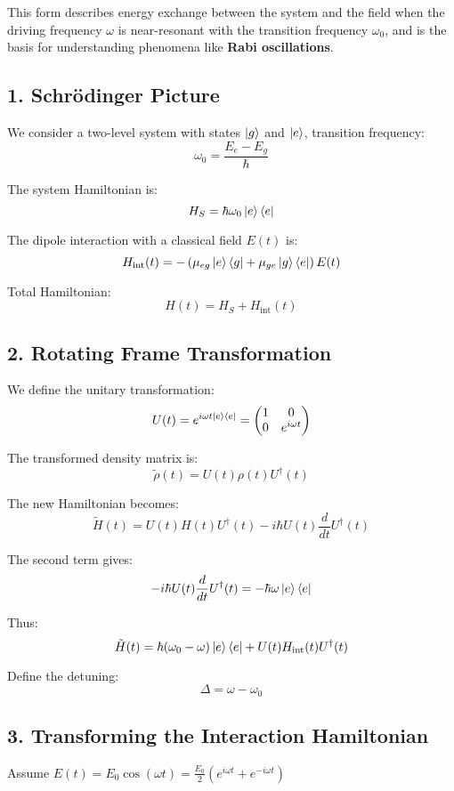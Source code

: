 This form describes energy exchange between the system and the field when the driving frequency \(\omega\) is near-resonant with the transition frequency \(\omega_0\), and is the basis for understanding phenomena like \textbf{Rabi oscillations}.

\subsection{1. Schrödinger Picture}
We consider a two-level system with states $\ket{g}$ and $\ket{e}$, transition frequency:
\[
	\omega_0 = \frac{E_e - E_g}{\hbar}
\]

The system Hamiltonian is:
\[
	H_S = \hbar \omega_0 \ket{e}\bra{e}
\]

The dipole interaction with a classical field $E(t)$ is:
\[
	H_{\text{int}}(t) = -\left( \mu_{eg} \ket{e}\bra{g} + \mu_{ge} \ket{g}\bra{e} \right) E(t)
\]

Total Hamiltonian:
\[
	H(t) = H_S + H_{\text{int}}(t)
\]

\subsection*{2. Rotating Frame Transformation}

We define the unitary transformation:
\[
	U(t) = e^{i \omega t \ket{e}\bra{e}} =
	\begin{pmatrix}
		1 & 0             \\
		0 & e^{i\omega t}
	\end{pmatrix}
\]

The transformed density matrix is:
\[
	\tilde{\rho}(t) = U(t) \rho(t) U^\dagger(t)
\]

The new Hamiltonian becomes:
\[
	\tilde{H}(t) = U(t) H(t) U^\dagger(t) - i\hbar U(t) \frac{d}{dt} U^\dagger(t)
\]

The second term gives:
\[
	-i\hbar U(t) \frac{d}{dt} U^\dagger(t) = - \hbar \omega \ket{e}\bra{e}
\]

Thus:
\[
	\tilde{H}(t) = \hbar (\omega_0 - \omega) \ket{e}\bra{e} + U(t) H_{\text{int}}(t) U^\dagger(t)
\]

Define the detuning:
\[
	\Delta = \omega - \omega_0
\]

\subsection*{3. Transforming the Interaction Hamiltonian}

Assume $E(t) = E_0 \cos(\omega t) = \frac{E_0}{2} (e^{i\omega t} + e^{-i\omega t})$

